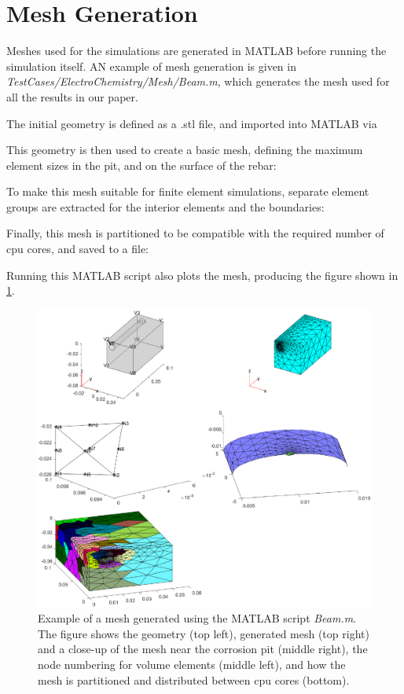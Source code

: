 \documentclass[3p]{elsarticle} %
\newcommand{\CodeSnip}[3]{}
\begin{document}
\section{Mesh Generation}
\label{sec:mesh}
Meshes used for the simulations are generated in MATLAB before running the simulation itself. AN example of mesh generation is given in \textit{TestCases/ElectroChemistry/Mesh/Beam.m}, which generates the mesh used for all the results in our paper. 

The initial geometry is defined as a .stl file, and imported into MATLAB via 
\CodeSnip{TestCases/ElectroChemistry/Mesh/Beam.m}{31}{32}
This geometry is then used to create a basic mesh, defining the maximum element sizes in the pit, and on the surface of the rebar:
\CodeSnip{TestCases/ElectroChemistry/Mesh/Beam.m}{37}{37}
To make this mesh suitable for finite element simulations, separate element groups are extracted for the interior elements and the boundaries:
\CodeSnip{TestCases/ElectroChemistry/Mesh/Beam.m}{47}{49}
Finally, this mesh is partitioned to be compatible with the required number of cpu cores, and saved to a file:
\CodeSnip{TestCases/ElectroChemistry/Mesh/Beam.m}{116}{122}
Running this MATLAB script also plots the mesh, producing the figure shown in \cref{fig:Mesh}.

\begin{figure}
	\centering
	\includegraphics[width=14cm]{MeshFig.eps}
	\caption{Example of a mesh generated using the MATLAB script \textit{Beam.m}. The figure shows the geometry (top left), generated mesh (top right) and a close-up of the mesh near the corrosion pit (middle right), the node numbering for volume elements (middle left), and how the mesh is partitioned and distributed between cpu cores (bottom).}
	\label{fig:Mesh}
\end{figure}
\end{document}
